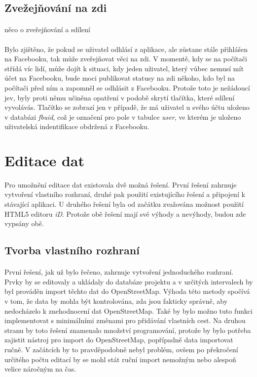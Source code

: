 \documentclass[11pt,a4paper,titlepage,oneside]{book}
\begin{document}
			\subsection{Zvežejňování na zdi}
				\paragraph{} {\Huge něco o zveřejňování a sdílení}
				\paragraph{} Bylo zjištěno, že pokud se uživatel odhlásí z aplikace, ale zůstane stále přihlášen na Facebooku, tak může zveřejňovat věci na zdi. V momentě, kdy se na počítači střídá víc lidí, může dojít k situaci, kdy jeden uživatel, který vůbec nemusí mít účet na Facebooku, bude moci publikovat statusy na zdi někoho, kdo byl na počítači před ním a zapomněl se odhlásit z Facebooku. Protože toto je nežádoucí jev, byly proti němu učiněna opatření v podobě skrytí tlačítka, které sdílení vyvolávás. Tlačítko se zobrazí jen v případě, že má uživatel u svého účtu uloženo v databázi \textit{fbuid}, což je označení pro pole v tabulce \textit{user}, ve kterém je uloženo uživatelská indentifikace obdržená z Facebooku.
		
		\section{Editace dat}
				\paragraph{} Pro umožnění editace dat existovala dvě možná řešení. První řešení zahrnuje vytvoření vlastního rozhraní, druhé pak použití existujícího řešení a připojení k stávající aplikaci. U druhého řešení byla od začátku zvažována možnost použití HTML5 editoru \textit{iD}. Protože obě řešení mají své výhody a nevýhody, budou zde vypsány obě.
			\subsection{Tvorba vlastního rozhraní}
				\paragraph{} První řešení, jak už bylo řečeno, zahrnuje vytvoření jednoduchého rozhraní. Prvky by se editovaly a  ukládaly do databáze projektu a v určitých intervalech by byl prováděn import těchto dat do OpenStreetMap. Výhoda této metody spočívá v tom, že data by mohla být kontrolována, zda jsou fakticky správně, aby nedocházelo k znehodnocení dat OpenStreetMap. Také by bylo možno tuto funkci implementovat s minimálními změnami pro přidávání vlastních cest. Na druhou stranu by toto řešení znamenalo množství programování, protože by bylo potřeba zajistit nástroj pro import do OpenStreetMap, popřípadně data importovat ručně. V začátcích by to pravděpodobně nebyl problém, ovšem po překročení určitého počtu editací by se mohl stát ruční import nemožným nebo alespoň velice náročným na čas.
\end{document}

